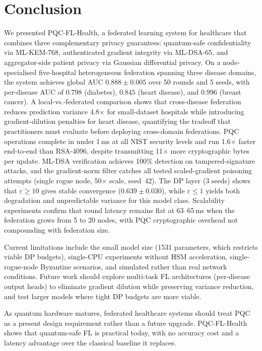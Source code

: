 \documentclass[conference]{IEEEtran}
\begin{document}
\section{Conclusion}
\label{sec:conclusion}

We presented PQC-FL-Health, a federated learning system for healthcare
that combines three complementary privacy guarantees: quantum-safe
confidentiality via ML-KEM-768, authenticated gradient integrity via
ML-DSA-65, and aggregator-side patient privacy via Gaussian
differential privacy.
On a node-specialised five-hospital heterogeneous federation spanning
three disease domains, the system achieves global AUC
$0.888 \pm 0.005$ over 50 rounds and 5 seeds, with per-disease AUC
of $0.798$ (diabetes), $0.845$ (heart disease), and $0.996$ (breast
cancer).
A local-vs.-federated comparison shows that cross-disease federation
reduces prediction variance 4.8$\times$ for small-dataset hospitals
while introducing gradient-dilution penalties for heart disease,
quantifying the tradeoff that practitioners must evaluate before
deploying cross-domain federations.
PQC operations complete in under 1\,ms at all NIST security levels
and run 1.6$\times$ faster end-to-end than RSA-4096, despite
transmitting 11$\times$ more cryptographic bytes per update.
ML-DSA verification achieves 100\% detection on tampered-signature
attacks, and the gradient-norm filter catches all tested scaled-gradient
poisoning attempts (single rogue node, 50$\times$ scale, seed~42).
The DP layer (3 seeds) shows that $\varepsilon \ge 10$ gives stable
convergence ($0.639 \pm 0.030$), while $\varepsilon \le 1$ yields
both degradation and unpredictable variance for this model class.
Scalability experiments confirm that round latency remains flat at
63--65\,ms when the federation grows from 5 to 20 nodes, with PQC
cryptographic overhead not compounding with federation size.

Current limitations include the small model size (1531 parameters,
which restricts viable DP budgets), single-CPU experiments without
HSM acceleration, single-rogue-node Byzantine scenarios, and
simulated rather than real network conditions.
Future work should explore multi-task FL architectures (per-disease
output heads) to eliminate gradient dilution while preserving
variance reduction, and test larger models where tight DP budgets
are more viable.

As quantum hardware matures, federated healthcare systems should
treat PQC as a present design requirement rather than a future
upgrade.
PQC-FL-Health shows that quantum-safe FL is practical today, with
no accuracy cost and a latency advantage over the classical baseline
it replaces.
\end{document}
